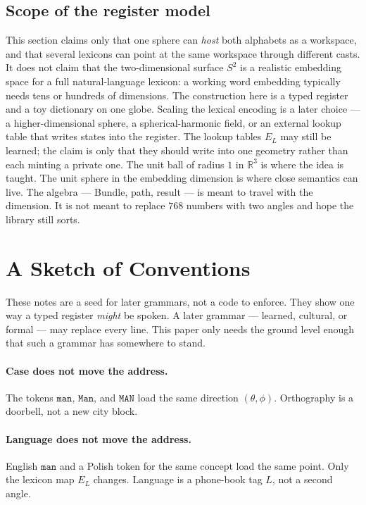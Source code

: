 \documentclass[12pt, a4paper]{article}
\begin{document}
\subsection{Scope of the register model}
\label{subsec:register_scope_final}
This section claims only that one sphere can \emph{host} both alphabets
as a workspace, and that several lexicons can point at the same
workspace through different casts. It does not claim that the two-dimensional surface
$S^2$ is a realistic embedding space for a full natural-language
lexicon: a working word embedding typically needs tens or hundreds of
dimensions. The construction here is a typed register and a toy
dictionary on one globe. Scaling the lexical encoding is a later
choice --- a higher-dimensional sphere, a spherical-harmonic field, or
an external lookup table that writes states into the register. The
lookup tables $E_L$ may still be learned; the claim is only that they
should write into one geometry rather than each minting a private one.
The unit ball of radius $1$ in $\mathbb{R}^3$ is where the idea is
taught. The unit sphere in the embedding dimension is where close
semantics can live. The algebra --- Bundle, path, result --- is
meant to travel with the dimension. It is not meant to replace $768$
numbers with two angles and hope the library still sorts.

\section{A Sketch of Conventions}
\label{sec:conventions_sketch}
These notes are a seed for later grammars, not a code to enforce.
They show one way a typed register \emph{might} be spoken. A later
grammar --- learned, cultural, or formal --- may replace every line.
This paper only needs the ground level enough that such a grammar has
somewhere to stand.

\paragraph{Case does not move the address.}
The tokens $\texttt{man}$, $\texttt{Man}$, and $\texttt{MAN}$ load the
same direction $(\theta,\phi)$. Orthography is a doorbell, not a new
city block.

\paragraph{Language does not move the address.}
English $\texttt{man}$ and a Polish token for the same concept load the
same point. Only the lexicon map $E_L$ changes. Language is a
phone-book tag $L$, not a second angle.
\end{document}
